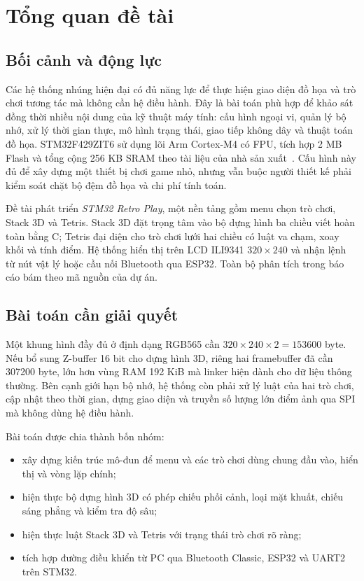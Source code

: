 \chapter{Tổng quan đề tài}
\label{chap:overview}

\section{Bối cảnh và động lực}

Các hệ thống nhúng hiện đại có đủ năng lực để thực hiện giao diện đồ họa và trò chơi tương tác mà không cần hệ điều hành. Đây là bài toán phù hợp để khảo sát đồng thời nhiều nội dung của kỹ thuật máy tính: cấu hình ngoại vi, quản lý bộ nhớ, xử lý thời gian thực, mô hình trạng thái, giao tiếp không dây và thuật toán đồ họa. STM32F429ZIT6 sử dụng lõi Arm Cortex-M4 có FPU, tích hợp 2 MB Flash và tổng cộng 256 KB SRAM theo tài liệu của nhà sản xuất~\cite{stm32datasheet}. Cấu hình này đủ để xây dựng một thiết bị chơi game nhỏ, nhưng vẫn buộc người thiết kế phải kiểm soát chặt bộ đệm đồ họa và chi phí tính toán.

Đề tài phát triển \textit{STM32 Retro Play}, một nền tảng gồm menu chọn trò chơi, Stack 3D và Tetris. Stack 3D đặt trọng tâm vào bộ dựng hình ba chiều viết hoàn toàn bằng C; Tetris đại diện cho trò chơi lưới hai chiều có luật va chạm, xoay khối và tính điểm. Hệ thống hiển thị trên LCD ILI9341 $320\times240$ và nhận lệnh từ nút vật lý hoặc cầu nối Bluetooth qua ESP32. Toàn bộ phân tích trong báo cáo bám theo mã nguồn của dự án.

\section{Bài toán cần giải quyết}

Một khung hình đầy đủ ở định dạng RGB565 cần $320\times240\times2=153600$ byte. Nếu bổ sung Z-buffer 16 bit cho dựng hình 3D, riêng hai framebuffer đã cần 307200 byte, lớn hơn vùng RAM 192 KiB mà linker hiện dành cho dữ liệu thông thường. Bên cạnh giới hạn bộ nhớ, hệ thống còn phải xử lý luật của hai trò chơi, cập nhật theo thời gian, dựng giao diện và truyền số lượng lớn điểm ảnh qua SPI mà không dùng hệ điều hành.

Bài toán được chia thành bốn nhóm:
\begin{itemize}
  \item xây dựng kiến trúc mô-đun để menu và các trò chơi dùng chung đầu vào, hiển thị và vòng lặp chính;
  \item hiện thực bộ dựng hình 3D có phép chiếu phối cảnh, loại mặt khuất, chiếu sáng phẳng và kiểm tra độ sâu;
  \item hiện thực luật Stack 3D và Tetris với trạng thái trò chơi rõ ràng;
  \item tích hợp đường điều khiển từ PC qua Bluetooth Classic, ESP32 và UART2 trên STM32.
\end{itemize}

